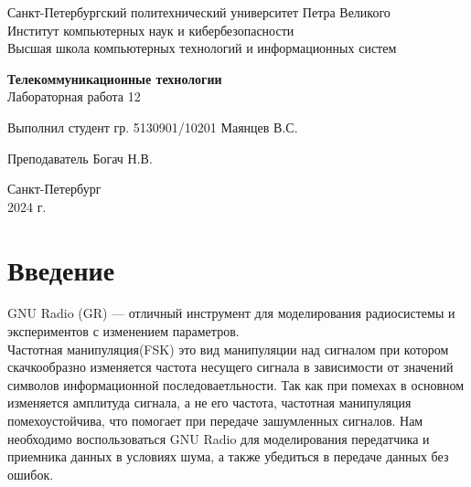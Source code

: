 \documentclass{article}
\begin{document}
\thispagestyle{empty} 
\vspace*{-3cm}
\begin{center}
    Санкт-Петербургский политехнический университет Петра Великого \\
    Институт компьютерных наук и кибербезопасности \\
    Высшая школа компьютерных технологий и информационных систем
\end{center}
\vspace{5cm}
\begin{center}
    \textbf{\Large Телекоммуникационные технологии} \\
    \vspace{0.5cm}
    \Large Лабораторная работа 12 \\
\end{center}
\vspace{3cm}
\begin{flushright}
\noindent Выполнил студент гр. 5130901/10201 \underline{\hspace{3cm}} Маянцев В.С. \\
\end{flushright}
\vspace{1cm}
\begin{flushright}
    \noindent Преподаватель \underline{\hspace{3cm}} Богач Н.В.
\end{flushright}
\vspace{8cm}
\begin{center}
    Санкт-Петербург \\
    2024 г.
\end{center}
\newpage




\newpage
\tableofcontents
\newpage




\newpage
\section{Введение}
GNU Radio (GR) — отличный инструмент для моделирования радиосистемы и экспериментов с изменением параметров. \\
Частотная манипуляция(FSK) это вид манипуляции над сигналом при котором скачкообразно изменяется частота несущего сигнала в зависимости от значений символов информационной последоваетльности. Так как при помехах в основном изменяется амплитуда сигнала, а не его частота, частотная манипуляция помехоустойчива, что помогает при передаче зашумленных сигналов. Нам необходимо воспользоваться GNU Radio для моделирования передатчика и приемника данных в условиях шума, а также убедиться в передаче данных без ошибок.
\newpage
\end{document}
